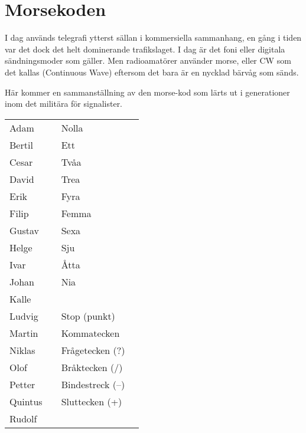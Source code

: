 \section{Morsekoden}

I dag används telegrafi ytterst sällan i kommersiella sammanhang, en
gång i tiden var det dock det helt dominerande trafikslaget. I dag är
det foni eller digitala sändningsmoder som gäller. Men radioamatörer
använder morse, eller CW som det kallas (Continuous Wave) eftersom det
bara är en nycklad bärvåg som sänds.

Här kommer en sammanställning av den morse-kod som lärts ut i
generationer inom det militära för signalister.

\begin{tabular}{llll}
	Adam    & \MAdam    & Nolla                 & \MNoll         \\
	Bertil  & \MBertil  & Ett                   & \MEtt          \\
	Cesar   & \MCesar   & Tvåa                  & \MTva          \\
	David   & \MDavid   & Trea                  & \MTre          \\
	Erik    & \MErik    & Fyra                  & \MFyra         \\
	Filip   & \MFilip   & Femma                 & \MFem          \\
	Gustav  & \MGustav  & Sexa                  & \MSex          \\
	Helge   & \MHelge   & Sju                   & \MSju          \\
	Ivar    & \MIvar    & Åtta                  & \MAtta         \\
	Johan   & \MJohan   & Nia                   & \MNio          \\
	Kalle   & \MKalle   &                       &  \\
	Ludvig  & \MLudvig  & Stop (punkt)          & \MSTOP         \\
	Martin  & \MMartin  & Kommatecken           & \MKomma        \\
	Niklas  & \MNiklas  & Frågetecken (?)       & \MFragetecken  \\
	Olof    & \MOlof    & Bråktecken (/)        & \MBraktecken   \\
	Petter  & \MPetter  & Bindestreck (--)      & \MBindestreck  \\
	Quintus & \MQvintus & Sluttecken (+)        & \MSluttecken   \\
	Rudolf  & \MRudolf  &                       &  \\

\end{tabular}
